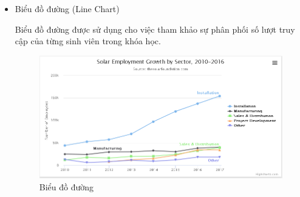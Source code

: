\begin{itemize}
	\item Biểu đồ đường (Line Chart)
	
	Biểu đồ đường được sử dụng cho việc tham khảo sự phân phối số lượt truy cập của từng sinh viên trong khóa học.
	
	\begin{center}
		\begin{figure}[htp]
			\begin{center}
				\includegraphics[scale=0.7]{img/line}
			\end{center}
			\caption{Biểu đồ đường}
			\label{refhinh18}
		\end{figure}
	\end{center}
	
\end{itemize}
